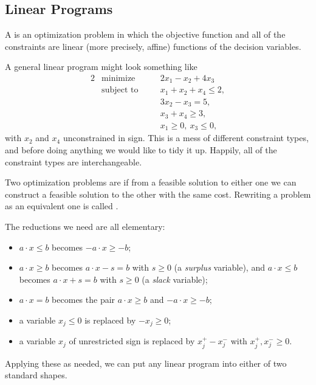\documentclass[a4paper]{scrartcl}
\begin{document}
\subsection{Linear Programs}

\begin{definition}
    A  is an optimization problem in which the objective function and all of the constraints are linear (more precisely, affine) functions of the decision variables.
\end{definition}

A general linear program might look something like
\begin{alignat*}{2}
    & \text{minimize} \quad && 2x_1 - x_2 + 4x_3 \\
    & \text{subject to} \quad && x_1 + x_2 + x_4 \leq 2, \\
    & && 3x_2 - x_3 = 5,\\
    & && x_3 + x_4 \geq 3,\\
    & && x_1 \geq 0,\ x_3 \leq 0,
\end{alignat*}
with $x_2$ and $x_4$ unconstrained in sign. This is a mess of different constraint types, and before doing anything we would like to tidy it up. Happily, all of the constraint types are interchangeable.

\begin{definition}
    Two optimization problems are  if from a feasible solution to either one we can construct a feasible solution to the other with the same cost. Rewriting a problem as an equivalent one is called .
\end{definition}

The reductions we need are all elementary:
\begin{itemize}
    \item $a\cdot x \leq b$ becomes $-a\cdot x \geq -b$;
    \item $a \cdot x \geq b$ becomes $a\cdot x - s = b$ with $s \geq 0$ (a \emph{surplus} variable), and $a\cdot x \leq b$ becomes $a\cdot x + s = b$ with $s \geq 0$ (a \emph{slack} variable);
    \item $a\cdot x = b$ becomes the pair $a\cdot x \geq b$ and $-a\cdot x \geq -b$;
    \item a variable $x_j \leq 0$ is replaced by $-x_j \geq 0$;
    \item a variable $x_j$ of unrestricted sign is replaced by $x_j^+ - x_j^-$ with $x_j^+, x_j^- \geq 0$.
\end{itemize}
Applying these as needed, we can put any linear program into either of two standard shapes.
\end{document}
